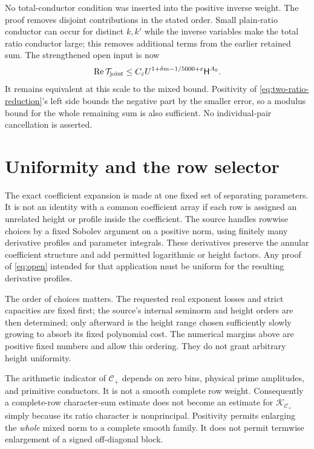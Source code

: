 \documentclass[11pt]{article}
\theoremstyle{definition}
\theoremstyle{remark}
\numberwithin{equation}{section}
\newcommand{\CC}{\mathcal C}
\newcommand{\HH}{\mathsf H}
\newcommand{\Rea}{\operatorname{Re}}
\newcommand{\ee}{\varepsilon}
\begin{document}
No total-conductor condition was inserted into the positive inverse
weight. The proof removes disjoint contributions in the stated order.
Small plain-ratio conductor can occur for distinct $k,k'$ while the
inverse variables make the total ratio conductor large; this removes
additional terms from the earlier retained sum. The strengthened open
input is now
\begin{equation}\label{eq:joint-open}
\Rea\mathcal T_{\rm joint}
\le C_\ee U^{1+\delta m-1/5000+\ee}\HH^{A_0}.
\end{equation}
It remains equivalent at this scale to the mixed bound. Positivity of
\eqref{eq:two-ratio-reduction}'s left side bounds the negative part by
the smaller error, so a modulus bound for the whole remaining sum is
also sufficient. No individual-pair cancellation is asserted.

\section{Uniformity and the row selector}\label{sec:uniformity}

The exact coefficient expansion is made at one fixed set of separating
parameters. It is not an identity with a common coefficient array if
each row is assigned an unrelated height or profile inside the
coefficient. The source handles rowwise choices by a fixed Sobolev
argument on a positive norm, using finitely many derivative profiles
and parameter integrals. These derivatives preserve the annular
coefficient structure and add permitted logarithmic or height factors.
Any proof of \eqref{eq:open} intended for that application must be
uniform for the resulting derivative profiles.

The order of choices matters. The requested real exponent losses and
strict capacities are fixed first; the source's internal seminorm and
height orders are then determined; only afterward is the height range
chosen sufficiently slowly growing to absorb its fixed polynomial cost.
The numerical margins above are positive fixed numbers and allow this
ordering. They do not grant arbitrary height uniformity.

The arithmetic indicator of $\CC_+$ depends on zero bins, physical
prime amplitudes, and primitive conductors. It is not a smooth complete
row weight. Consequently a complete-row character-sum estimate does
not become an estimate for $\mathcal K_{\CC_+}$ simply because its
ratio character is nonprincipal. Positivity permits enlarging the
\emph{whole} mixed norm to a complete smooth family. It does not permit
termwise enlargement of a signed off-diagonal block.
\end{document}
